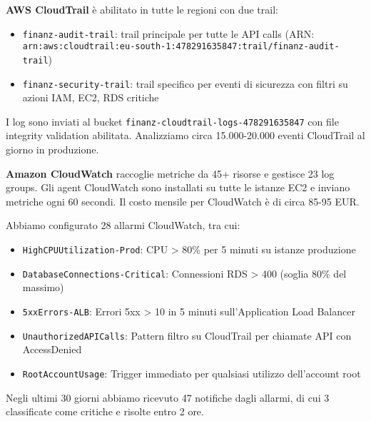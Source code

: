 \textbf{AWS CloudTrail} è abilitato in tutte le regioni con due trail:
\begin{itemize}
    \item \texttt{finanz-audit-trail}: trail principale per tutte le API calls (ARN: \texttt{arn:aws:cloudtrail:eu-south-1:478291635847:trail/finanz-audit-trail})
    \item \texttt{finanz-security-trail}: trail specifico per eventi di sicurezza con filtri su azioni IAM, EC2, RDS critiche
\end{itemize}
I log sono inviati al bucket \texttt{finanz-cloudtrail-logs-478291635847} con file integrity validation abilitata. Analizziamo circa 15.000-20.000 eventi CloudTrail al giorno in produzione.

\textbf{Amazon CloudWatch} raccoglie metriche da 45+ risorse e gestisce 23 log groups. Gli agent CloudWatch sono installati su tutte le istanze EC2 e inviano metriche ogni 60 secondi. Il costo mensile per CloudWatch è di circa 85-95 EUR.

Abbiamo configurato 28 allarmi CloudWatch, tra cui:
\begin{itemize}
    \item \texttt{HighCPUUtilization-Prod}: CPU > 80\% per 5 minuti su istanze produzione
    \item \texttt{DatabaseConnections-Critical}: Connessioni RDS > 400 (soglia 80\% del massimo)
    \item \texttt{5xxErrors-ALB}: Errori 5xx > 10 in 5 minuti sull'Application Load Balancer  
    \item \texttt{UnauthorizedAPICalls}: Pattern filtro su CloudTrail per chiamate API con AccessDenied
    \item \texttt{RootAccountUsage}: Trigger immediato per qualsiasi utilizzo dell'account root
\end{itemize}
Negli ultimi 30 giorni abbiamo ricevuto 47 notifiche dagli allarmi, di cui 3 classificate come critiche e risolte entro 2 ore.


